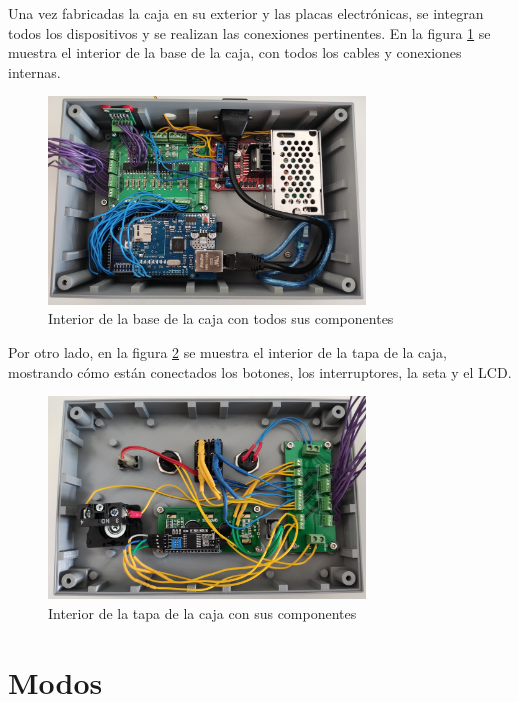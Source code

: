 Una vez fabricadas la caja en su exterior y las placas electrónicas, se integran todos 
los dispositivos y se realizan las conexiones pertinentes. En la figura \ref{fig:cajainterior}
se muestra el interior de la base de la caja, con todos los cables y conexiones internas.

\begin{figure}[hbtp]%
    \centering 
        \includegraphics[width=0.75\textwidth]{07-resultados/cajainterior.jpg}
    \caption{Interior de la base de la caja con todos sus componentes}
    \label{fig:cajainterior} 
\end{figure}

Por otro lado, en la figura \ref{fig:cajatapainterior} se muestra el interior de la tapa de la 
caja, mostrando cómo están conectados los botones, los interruptores, la seta y el LCD.

\begin{figure}[hbtp]
    \centering 
        \includegraphics[width=0.75\textwidth]{07-resultados/cajatapa.jpg}
    \caption{Interior de la tapa de la caja con sus componentes}
    \label{fig:cajatapainterior} 
\end{figure}


\section{Modos}

